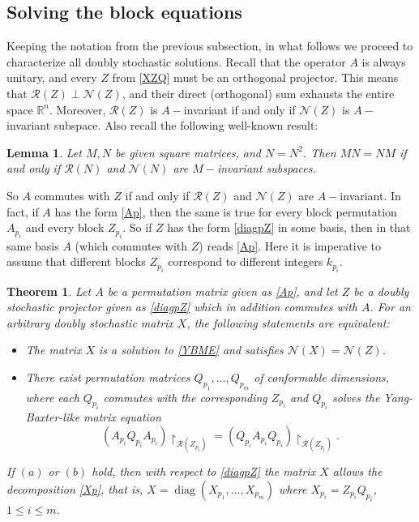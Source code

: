 \documentclass{article}
\newtheorem{theorem}{Theorem}[section]
\newtheorem{lemma}{Lemma}[section]
\theoremstyle{definition}\newtheorem{example}{Example}[section]
\def\N{{\mathcal{N}}}
\def\R{{\mathcal{R}}}
\def\RR{\mathbb{R}}
\begin{document}
	
	\subsection{Solving the block equations}
	
	Keeping the notation from the previous subsection, in what follows we proceed to characterize all doubly stochastic solutions. Recall that the operator $A$ is always unitary, and every $Z$ from \eqref{XZQ} must be an orthogonal projector. This means that $\R(Z)\perp\N(Z)$, and their direct (orthogonal) sum exhausts the entire space $\RR^n$. Moreover, $\R(Z)$ is $A-$invariant if and only if $\N(Z)$ is $A-$invariant subspace. Also recall the following well-known result:

\begin{lemma} Let $M,N$ be given square matrices, and $N=N^2$. Then $MN=NM$ if and only if $\R(N)$ and $\N(N)$ are $M-$invariant subspaces.
\end{lemma}
So $A$ commutes with $Z$ if and only if $\R(Z)$ and $\N(Z)$ are $A-$invariant. In fact, if $A$ has the form \eqref{Ap}, then the same is true for every block permutation $A_{p_i}$ and every block $Z_{p_i}$. So if $Z$ has the form \eqref{diagpZ} in some basis, then in that same basis $A$ (which commutes with $Z$) reads \eqref{Ap}. Here it is imperative to assume that different blocks $Z_{p_i}$ correspond to different integers $k_{p_i}$.

\begin{theorem}\label{equivQ} Let $A$ be a permutation matrix given as \eqref{Ap}, and let $Z$ be a doubly stochastic projector given as \eqref{diagpZ} which in addition commutes with $A$. For an arbitrary doubly stochastic matrix $X$, the following statements are equivalent:
	\begin{itemize}
		\item[(a)] The matrix $X$ is a solution to \eqref{YBME} and satisfies $\N(X)=\N(Z)$.
		\item[(b)] There exist permutation matrices $Q_{p_1},\ldots,Q_{p_m}$ of conformable dimensions, where each $Q_{p_i}$ commutes with the corresponding $Z_{p_i}$ and $Q_{p_i}$ solves the Yang-Baxter-like matrix equation
		\begin{equation}\label{A4Q4perm}\left(A_{p_i}Q_{p_i}A_{p_i}\right)\upharpoonright_{\R(Z_{p_i})}=\left(Q_{p_i}A_{p_i}Q_{p_i}\right)\upharpoonright_{\R(Z_{p_i})}.\end{equation}
	\end{itemize}
	If $(a)$ or $(b)$ hold, then with respect to \eqref{diagpZ} the matrix $X$ allows the decomposition \eqref{Xp}, that is,  $X=\operatorname{diag}\left(X_{p_1},\ldots,X_{p_m}\right)$ where $X_{p_i}=Z_{p_i}Q_{p_i}$, $1\leq i\leq m$.
	\end{theorem}
	
\end{document}
